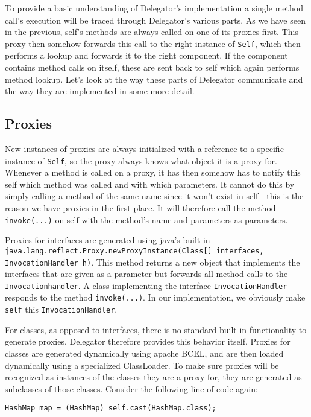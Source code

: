 \documentclass[a4paper,12pt]{book}
\begin{document}
To provide a basic understanding of Delegator's implementation a single method call's execution will be traced through Delegator's various parts. As we have seen in the previous, self's methods are always called on one of its proxies first. This proxy then somehow forwards this call to the right instance of \verb|Self|, which then performs a lookup and forwards it to the right component. If the component contains method calls on itself, these are sent back to self which again performs method lookup. Let's look at the way these parts of Delegator communicate and the way they are implemented in some more detail.

\subsection*{Proxies}
New instances of proxies are always initialized with a reference to a specific instance of \verb|Self|, so the proxy always knows what object it is a proxy for. Whenever a method is called on a proxy, it has then somehow has to notify this self which method was called and with which parameters. It cannot do this by simply calling a method of the same name since it won't exist in self - this is the reason we have proxies in the first place. It will therefore call the method \verb|invoke(...)| on self with the method's name and parameters as parameters.

Proxies for interfaces are generated using java's built in \verb|java.lang.reflect.Proxy.newProxyInstance(Class[] interfaces, InvocationHandler h)|. This method returns a new object that implements the interfaces that are given as a parameter but forwards all method calls to the \verb|Invocationhandler|. A class implementing the interface \verb|InvocationHandler| responds to the method \verb|invoke(...)|. In our implementation, we obviously make \verb|self| this \verb|InvocationHandler|.

For classes, as opposed to interfaces, there is no standard built in functionality to generate proxies. Delegator therefore provides this behavior itself. Proxies for classes are generated dynamically using apache BCEL, and are then loaded dynamically using a specialized ClassLoader. To make sure proxies will be recognized as instances of the classes they are a proxy for, they are generated as subclasses of those classes. Consider the following line of code again:

\begin{verbatim}
HashMap map = (HashMap) self.cast(HashMap.class);
\end{verbatim}
\end{document}
